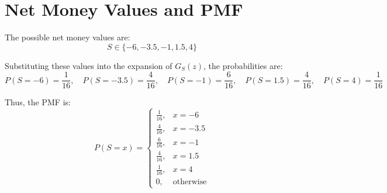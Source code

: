 \documentclass[journal]{IEEEtran}
\numberwithin{equation}{enumi}
\numberwithin{figure}{enumi}
\begin{document}
\section*{Net Money Values and PMF}

The possible net money values are:
\[
S \in \{-6, -3.5, -1, 1.5, 4\}
\]

Substituting these values into the expansion of \(G_S(z)\), the probabilities are:
\[
P(S = -6) = \frac{1}{16}, \quad P(S = -3.5) = \frac{4}{16}, \quad P(S = -1) = \frac{6}{16}, \quad P(S = 1.5) = \frac{4}{16}, \quad P(S = 4) = \frac{1}{16}
\]

Thus, the PMF is:
\[
P(S = x) =
\begin{cases}
\frac{1}{16}, & x = -6 \\
\frac{4}{16}, & x = -3.5 \\
\frac{6}{16}, & x = -1 \\
\frac{4}{16}, & x = 1.5 \\
\frac{1}{16}, & x = 4 \\
0, & \text{otherwise}
\end{cases}
\]
\end{document}
